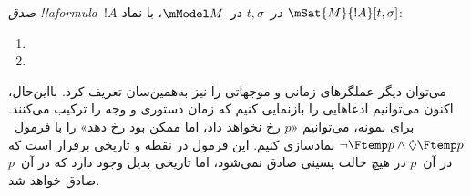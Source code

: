 \documentclass[../../../include/open-logic-section]{subfiles}
\begin{document}
\begin{defn}
  \emph{صدق !!a{formula}~$!A$ در~$t, \sigma$} در~$\mModel M$، با نماد
  $\mSat{M}{!A}[t, \sigma]$:
  \begin{enumerate}
  \item{} 
  \item{} 
  \end{enumerate} 
\end{defn}

می‌توان دیگر عملگرهای زمانی و موجهاتی را نیز به‌همین‌سان تعریف کرد.
بااین‌حال، اکنون می‌توانیم ادعاهایی را بازنمایی کنیم که زمان دستوری و
وجه را ترکیب می‌کنند. برای نمونه، می‌توانیم «$p$ رخ نخواهد داد، اما
ممکن بود رخ دهد» را با فرمول~$\lnot \Ftemp p \land \Diamond \Ftemp p$
نمادسازی کنیم. این فرمول در نقطه و تاریخی برقرار است که در آن~$p$ در
هیچ حالت پسینی صادق نمی‌شود، اما تاریخی بدیل وجود دارد که در آن~$p$
صادق خواهد شد.
\end{document}
